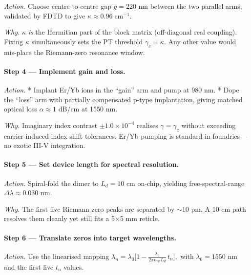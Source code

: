 \documentclass[11pt]{article}
\begin{document}
\emph{Action.}\;  
Choose centre-to-centre gap \(g=220\) nm between the two parallel arms,
validated by FDTD to give
\(\kappa\approx0.96\;\text{cm}^{-1}\).

\emph{Why.}\;  
\(\kappa\) \emph{is} the Hermitian part of the block matrix
(off-diagonal real coupling).  
Fixing \(\kappa\) simultaneously sets the PT threshold
\(\gamma_{c}=\kappa\).  
Any other value would mis-place the Riemann-zero resonance window.

\vspace{0.4em}
\paragraph{Step 4 — Implement gain and loss.}

\emph{Action.}\;  
* Implant Er/Yb ions in the “gain” arm and pump at 980 nm.  
* Dope the “loss” arm with partially compensated p-type implantation,
  giving matched optical loss $\alpha\approx1$ dB/cm at 1550 nm.

\emph{Why.}\;  
Imaginary index contrast
\(\pm1.0\times10^{-4}\) realises
\(\gamma=\gamma_{c}\) without exceeding
carrier-induced index shift tolerances.
Er/Yb pumping is standard in foundries—no exotic III-V integration.

\vspace{0.4em}
\paragraph{Step 5 — Set device length for spectral resolution.}

\emph{Action.}\;  
Spiral-fold the dimer to \(L_d=10\) cm on-chip,  
yielding free-spectral-range  
\(\Delta\lambda\approx0.030\) nm.

\emph{Why.}\;  
The first five Riemann‐zero peaks are separated by
$\sim10$ pm.
A 10-cm path resolves them cleanly yet still fits a 5×5 mm reticle.

\vspace{0.4em}
\paragraph{Step 6 — Translate zeros into target wavelengths.}

\emph{Action.}\;  
Use the linearised mapping  
\(
   \lambda_n = \lambda_0\bigl[1-\tfrac{\lambda_0}{2\pi n_{\text{eff}}L_d}\,t_n\bigr],
\)  
with $\lambda_0=1550$ nm and the first five $t_n$ values.
\end{document}
